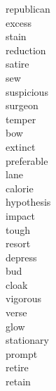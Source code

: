 \documentclass[a4paper, 11pt]{ctexart}
\begin{document}
\begin{multicols*}{3}
\begin{description}
\item[republican]

\item[excess]

\item[stain]

\item[reduction]

\item[satire]

\item[sew]

\item[suspicious]

\item[surgeon]

\item[temper]

\item[bow]

\item[extinct]

\item[preferable]

\item[lane]

\item[calorie]

\item[hypothesis]

\item[impact]

\item[tough]

\item[resort]

\item[depress]

\item[bud]

\item[cloak]

\item[vigorous]

\item[verse]

\item[glow]

\item[stationary]

\item[prompt]

\item[retire]

\item[retain]


\end{description}
\end{multicols*}
\end{document}
